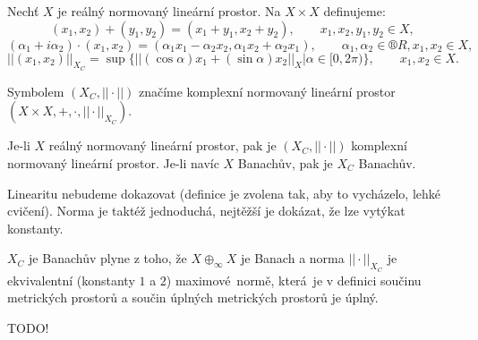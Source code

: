 \documentclass[12pt]{article}					%
\begin{document}
\begin{definice}
	Nechť $X$ je reálný normovaný lineární prostor. Na $X \times X$ definujeme:
	$$ (x_1, x_2) + (y_1, y_2) = (x_1 + y_1, x_2 + y_2), \qquad x_1, x_2, y_1, y_2 \in X, $$
	$$ (\alpha_1 + i\alpha_2)·(x_1, x_2) = (\alpha_1x_1 - \alpha_2x_2, \alpha_1x_2 + \alpha_2 x_1), \qquad \alpha_1, \alpha_2 \in ®R, x_1, x_2 \in X, $$
	$$ ||(x_1, x_2)||_{X_C} = \sup\{||(\cos \alpha)x_1 + (\sin \alpha)x_2||_X | \alpha \in [0, 2\pi)\}, \qquad x_1, x_2 \in X. $$

	Symbolem $(X_C, ||·||)$ značíme komplexní normovaný lineární prostor $(X \times X, +, ·, ||·||_{X_C})$.
\end{definice}

\begin{veta}[Komplexifikace]
	Je-li $X$ reálný normovaný lineární prostor, pak je $(X_C, ||·||)$ komplexní normovaný lineární prostor. Je-li navíc $X$ Banachův, pak je $X_C$ Banachův.

	\begin{dukazin}
		Linearitu nebudeme dokazovat (definice je zvolena tak, aby to vycházelo, lehké cvičení). Norma je taktéž jednoduchá, nejtěžší je dokázat, že lze vytýkat konstanty.

		$X_C$ je Banachův plyne z toho, že $X \oplus_∞ X$ je Banach a norma $||·||_{X_C}$ je ekvivalentní (konstanty $1$ a $2$) maximové normě, která je v definici součinu metrických prostorů a součin úplných metrických prostorů je úplný.
	\end{dukazin}
\end{veta}


\begin{definice}
	TODO!
\end{definice}
\end{document}
